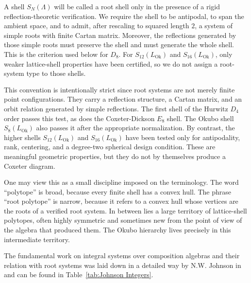 \documentclass{birkjour}
\newcommand{\LOk}{L_{\mathrm{Ok}}}
\numberwithin{equation}{section}
\begin{document}
A shell \(S_N(\Lambda)\) will be called a root shell only in the presence of a
rigid reflection-theoretic verification. We require the shell to be antipodal,
to span the ambient space, and to admit, after rescaling to squared length
\(2\), a system of simple roots with finite Cartan matrix. Moreover, the
reflections generated by those simple roots must preserve the shell and must
generate the whole shell. This is the criterion used below for \(D_8\). For
\(S_{12}(\LOk)\) and \(S_{16}(\LOk)\), only weaker lattice-shell properties have
been certified, so we do not assign a root-system type to those shells.

This convention is intentionally strict since root systems are not merely finite point configurations. They carry a
reflection structure, a Cartan matrix, and an orbit relation generated by
simple reflections. The first shell of the Hurwitz \(D_4\) order passes this
test, as does the Coxeter-Dickson \(E_8\) shell. The Okubo shell
\(S_8(\LOk)\) also passes it after the appropriate normalization. By contrast,
the higher shells \(S_{12}(\LOk)\) and \(S_{16}(\LOk)\) have been tested only
for antipodality, rank, centering, and a degree-two spherical design condition.
These are meaningful geometric properties, but they do not by themselves
produce a Coxeter diagram.

One may view this as a small discipline imposed on the terminology. The word
``polytope'' is broad, because every finite shell has a convex hull. The phrase
``root polytope'' is narrow, because it refers to a convex hull whose vertices
are the roots of a verified root system. In between lies a large territory of
lattice-shell polytopes, often highly symmetric and sometimes new from the
point of view of the algebra that produced them. The Okubo hierarchy lives
precisely in this intermediate territory.

The fundamental work on integral systems over composition algebras and their relation with root systems was laid down in a detailed way by N.W. Johnson in \cite{Jo13,Jo17,Jo18} and can be found in Table~\ref{tab:Johnson Integers}.
\end{document}
